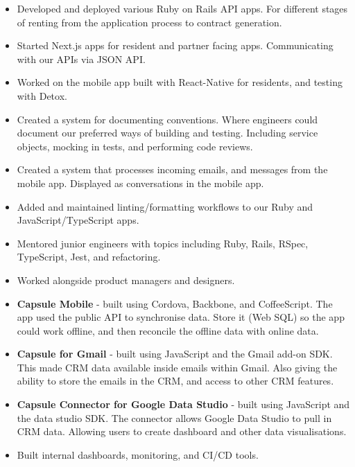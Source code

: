 \begin{itemize}
  \item Developed and deployed various Ruby on Rails API apps. For different
    stages of renting from the application process to contract generation.
  \item Started Next.js apps for resident and partner facing apps. Communicating
    with our APIs via JSON API.
  \item Worked on the mobile app built with React-Native for residents, and
    testing with Detox.
  \item Created a system for documenting conventions. Where engineers could
    document our preferred ways of building and testing. Including service
    objects, mocking in tests, and performing code reviews.
  \item Created a system that processes incoming emails, and messages from the
    mobile app. Displayed as conversations in the mobile app.
  \item Added and maintained linting/formatting workflows to our Ruby and
    JavaScript/TypeScript apps.
  \item Mentored junior engineers with topics including Ruby, Rails, RSpec,
    TypeScript, Jest, and refactoring.
  \item Worked alongside product managers and designers.
\end{itemize}

\begin{itemize}
  \item \textbf{Capsule Mobile} - built using Cordova, Backbone, and
    CoffeeScript. The app used the public API to synchronise data. Store it
    (Web SQL) so the app could work offline, and then reconcile the offline data
    with online data.
  \item \textbf{Capsule for Gmail} - built using JavaScript and the Gmail add-on
    SDK. This made CRM data available inside emails within Gmail. Also giving
    the ability to store the emails in the CRM, and access to other CRM
    features.
  \item \textbf{Capsule Connector for Google Data Studio} - built using
    JavaScript and the data studio SDK. The connector allows Google Data Studio
    to pull in CRM data. Allowing users to create dashboard and other data
    visualisations.
  \item Built internal dashboards, monitoring, and CI/CD tools.
\end{itemize}

